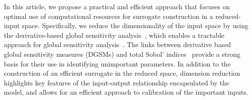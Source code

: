  

In this article, we propose a practical and efficient approach that focuses on
optimal use of computational resources for surrogate construction in a 
reduced-input space. Specifically, we reduce the dimensionality of the
input space by using the derivative-based global sensitivity
analysis~\cite{Sobol:2009,Sobol:2010,Lamboni:2013,Kucherenko:2009,Kucherenko:2016},
which enables a tractable approach for global sensitivity
analysis~\cite{Kucherenko:2016}. The links between derivative based
global sensitivity measures (DGSMs) and total Sobol'
indices~\cite{Sobol:2009,Kucherenko:2009,Kucherenko:2016} provide a strong
basis for their use in identifying unimportant parameters. In addition
to the construction of an efficient surrogate in the reduced space,
dimension reduction highlights key features of the input-output relationship
encapsulated by the model, and allows for an efficient approach to calibration
of the important inputs. 

%
%

